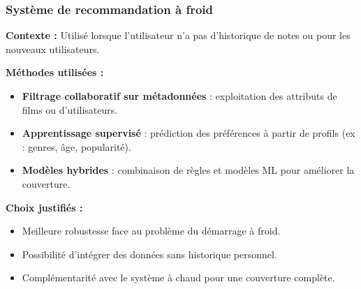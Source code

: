 \documentclass{beamer}
\begin{document}
\begin{frame}
    \scriptsize
    \frametitle{Système de recommandation à froid}
    \textbf{Contexte :} Utilisé lorsque l’utilisateur n’a pas d’historique de notes ou pour les nouveaux utilisateurs.

    \vspace{0.3cm}
    \textbf{Méthodes utilisées :}
    \begin{itemize}
        \item \textbf{Filtrage collaboratif sur métadonnées} : exploitation des attributs de films ou d’utilisateurs.
        \item \textbf{Apprentissage supervisé} : prédiction des préférences à partir de profils (ex : genres, âge, popularité).
        \item \textbf{Modèles hybrides} : combinaison de règles et modèles ML pour améliorer la couverture.
    \end{itemize}

    \vspace{0.3cm}
    \textbf{Choix justifiés :}
    \begin{itemize}
        \item Meilleure robustesse face au problème du démarrage à froid.
        \item Possibilité d'intégrer des données sans historique personnel.
        \item Complémentarité avec le système à chaud pour une couverture complète.
    \end{itemize}
\end{frame}




\end{document}
